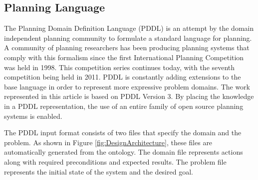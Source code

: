 \subsection{Planning Language}
The Planning Domain Definition Language (PDDL) \cite{PDDL} is an attempt by the
domain independent planning community to formulate a standard language
for planning. A community of planning researchers has been producing
planning systems that comply with this formalism since the first International
Planning Competition was held in 1998. This competition series continues today,
with the seventh competition being held in 2011. PDDL is constantly
adding extensions to the base language in order to represent more expressive
problem domains. The work represented in this article is based on PDDL Version 3.
By placing the knowledge in a PDDL representation, the use of an
entire family of open source planning systems is enabled.

The PDDL input format consists
of two files that specify the domain and the problem. As shown in Figure
\ref{fig:DesignArchitecture}, these files are automatically
generated from the ontology. The domain file represents actions along
with required preconditions and expected results. The problem file
represents the initial state of the system and the desired goal.

